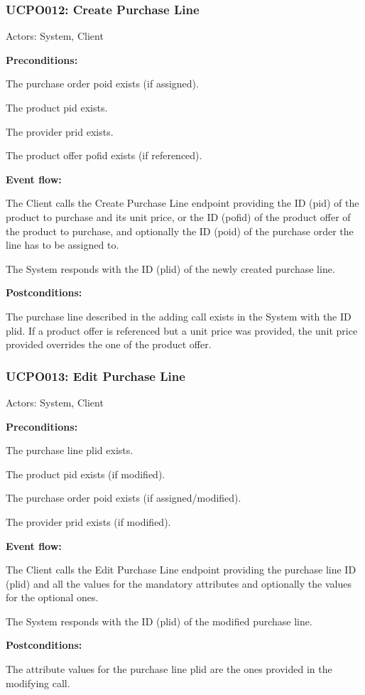 \begin{ucbox}{\subsubsection{UCPO012: Create Purchase Line}}
\label{UCPO012}

Actors: System, Client

\textbf{Preconditions:}

\ucitem The purchase order poid exists (if assigned).

\ucitem The product pid exists.

\ucitem The provider prid exists.

\ucitem The product offer pofid exists (if referenced).

\textbf{Event flow:}

\ucitem The Client calls the Create Purchase Line endpoint providing the ID (pid) of the product to purchase and its unit price, or the ID (pofid) of the product offer of the product to purchase, and optionally the ID (poid) of the purchase order the line has to be assigned to.

\ucitem The System responds with the ID (plid) of the newly created purchase line.

\textbf{Postconditions:}

\ucitem The purchase line described in the adding call exists in the System with the ID plid. If a product offer is referenced but a unit price was provided, the unit price provided overrides the one of the product offer.

\end{ucbox}

\begin{ucbox}{\subsubsection{UCPO013: Edit Purchase Line}}
\label{UCPO013}

Actors: System, Client

\textbf{Preconditions:}

\ucitem The purchase line plid exists.

\ucitem The product pid exists (if modified).

\ucitem The purchase order poid exists (if assigned/modified).

\ucitem The provider prid exists (if modified).

\textbf{Event flow:}

\ucitem The Client calls the Edit Purchase Line endpoint providing the purchase line ID (plid) and all the values for the mandatory attributes and optionally the values for the 
optional ones.

\ucitem The System responds with the ID (plid) of the modified purchase line.

\textbf{Postconditions:}

\ucitem The attribute values for the purchase line plid are the ones provided in the modifying call.

\end{ucbox}

